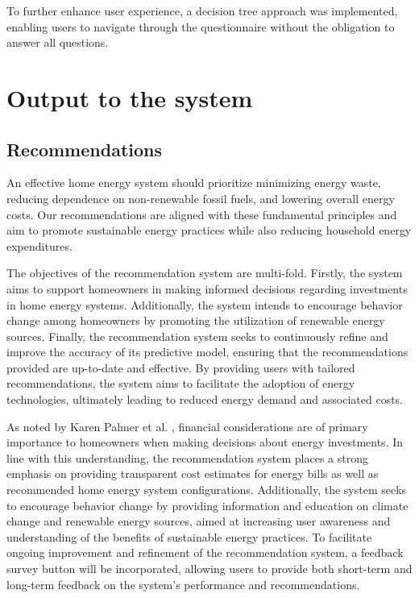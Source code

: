 To further enhance user experience, a decision tree approach was implemented, enabling users to navigate through the questionnaire without the obligation to answer all questions.



\section{Output to the system}

\subsection{Recommendations}

An effective home energy system should prioritize minimizing energy waste, reducing dependence on non-renewable fossil fuels, and lowering overall energy costs. Our recommendations are aligned with these fundamental principles and aim to promote sustainable energy practices while also reducing household energy expenditures. 

The objectives of the recommendation system are multi-fold. 
Firstly, the system aims to support homeowners in making informed decisions regarding investments in home energy systems. 
Additionally, the system intends to encourage behavior change among homeowners by promoting the utilization of renewable energy sources. 
Finally, the recommendation system seeks to continuously refine and improve the accuracy of its predictive model, ensuring that the recommendations provided are up-to-date and effective. 
By providing users with tailored recommendations, the system aims to facilitate the adoption of energy technologies, ultimately leading to reduced energy demand and associated costs. 

As noted by Karen Palmer et al. \cite{informationgap}, financial considerations are of primary importance to homeowners when making decisions about energy investments. 
In line with this understanding, the recommendation system places a strong emphasis on providing transparent cost estimates for energy bills as well as recommended home energy system configurations. 
Additionally, the system seeks to encourage behavior change by providing information and education on climate change and renewable energy sources, aimed at increasing user awareness and understanding of the benefits of sustainable energy practices. 
To facilitate ongoing improvement and refinement of the recommendation system, a feedback survey button will be incorporated, allowing users to provide both short-term and long-term feedback on the system's performance and recommendations. 

